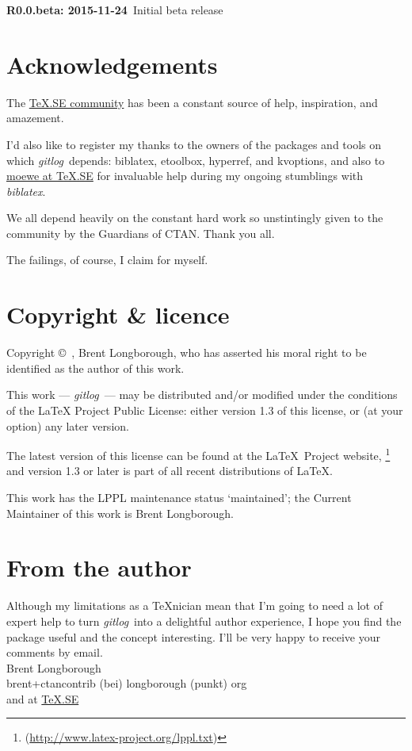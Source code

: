 \documentclass[a4paper,12pt,twoside,openany]{memoir}
\newcommand{\rpara}[1]{\par\noindent\textbf{#1}\,}
\newcommand{\sfit}[1]{\textit{#1}}
\newcommand{\tpname}{\sfit{gitlog}}
\begin{document}
\rpara{R0.0.beta: 2015-11-24}
Initial beta release

\section{Acknowledgements}

The \href{http://tex.stackexchange.com}{\TeX.SE community}
has been a constant source of help, inspiration, and amazement.

I'd also like to register my thanks to the owners of the packages and tools 
on which \tpname\ depends: 
biblatex, etoolbox, hyperref, and kvoptions,
and also to 
\href{http://tex.stackexchange.com/users/35864/moewe}{moewe at \TeX.SE} for
invaluable help during my ongoing stumblings with \sfit{biblatex}.

We all depend heavily on the constant hard work
so unstintingly given to the community by the Guardians of CTAN. 
Thank you all.

The failings, of course, I claim for myself.

\section{Copyright \& licence}
Copyright \copyright\ , Brent Longborough,
who has asserted his moral right
to be identified as the author of this work.

This work --- \tpname\ --- may be distributed and/or modified under the
conditions of the LaTeX Project Public License: either version 1.3
of this license, or (at your option) any later version.

The latest version of this license can be found
at the \LaTeX\ Project website,%
\footnote{(\url{http://www.latex-project.org/lppl.txt})}
and version 1.3 or later is part of all recent distributions of
\LaTeX.

This work has the LPPL maintenance status `maintained';
the Current Maintainer of this work is Brent Longborough.


\section{From the author}
Although my limitations as a \TeX nician
mean that I'm going to need a lot of expert help
to turn \tpname\ into a delightful author experience,
I hope you find the package useful and the concept interesting.
I'll be very happy to receive your comments by email.\\[\baselineskip]
Brent Longborough\\[\baselineskip]
\textsf{brent+ctancontrib (bei) longborough (punkt) org}\\
and at \href{http://tex.stackexchange.com/users/344/brent-longborough}{\TeX.SE}
\printGitLog
\end{document}
